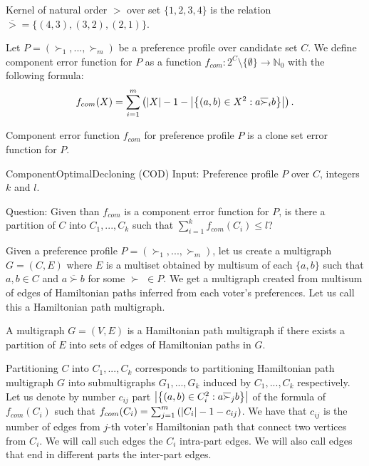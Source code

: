 \begin{exmp}
Kernel of natural order $>$ over set $\{1,2,3,4\}$ is the relation
$\overline{>} = \{(4,3), (3,2), (2,1)\}$.
\end{exmp}

\begin{defn}
Let $P = (\succ_1, ..., \succ_m)$ be a preference profile over candidate set $C$.
We define component error function for $P$ as
a function $f_{com}: 2^C \setminus \{\emptyset\} \rightarrow \mathbb{N}_0$ with the following formula:
$$ f_{com}(X) = \sum_{i=1}^m \left( \left\vert X \right\vert-1 -
\left\vert \left\lbrace \left( a,b \right) \in X^2 : a \overline{\succ}_i b \right\rbrace  \right\vert
\right) \text{.}$$
\end{defn}

\begin{rmrk}
Component error function $f_{com}$ for preference profile $P$ is a clone set error function for $P$.
\end{rmrk}

\begin{problem}{ComponentOptimalDecloning (COD)}
	Input: Preference profile $P$ over $C$, integers $k$ and $l$.

	Question: Given than $f_{com}$ is a component error function for $P$,
		is there a partition of $C$ into $C_1, ..., C_k$ such that $\sum_{i=1}^k f_{com}(C_i) \leq l$?
\end{problem}

Given a preference profile $P = (\succ_1, ..., \succ_m)$, let us create a multigraph $G=(C,E)$
where $E$ is a multiset obtained by multisum
of each $\{a,b\}$ such that $a,b \in C$ and $a \overline{\succ} b$ for some $\succ$ \xspace $ \in P$.
We get a multigraph created from multisum of edges of Hamiltonian paths inferred from each voter's preferences.
Let us call this a Hamiltonian path multigraph.

\begin{defn}
A multigraph $G=(V,E)$ is a Hamiltonian path multigraph if there exists a partition of $E$
into sets of edges of Hamiltonian paths in $G$.
\end{defn}

Partitioning $C$ into $C_1,...,C_k$ corresponds to
partitioning Hamiltonian path multigraph $G$ into submultigraphs $G_1,...,G_k$
induced by $C_1,...,C_k$ respectively.
Let us denote by number $c_{ij}$ part
$\left\vert \left\lbrace \left( a,b \right) \in C_i^2 : a \overline{\succ}_j b \right\rbrace  \right\vert$
of the formula of $f_{com}(C_i)$ such that
$f_{com}(C_i) = \sum_{j=1}^m \left( \left\vert C_i \right\vert - 1 - c_{ij} \right)$.
We have that $c_{ij}$ is the number of edges from $j$-th voter's Hamiltonian path
that connect two vertices from $C_i$.
We will call such edges the $C_i$ intra-part edges.
We will also call edges that end in different parts the inter-part edges.

